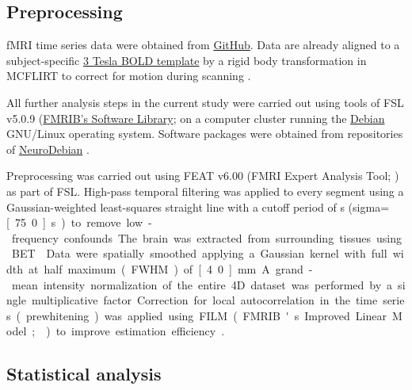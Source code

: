 \documentclass[english]{article}
\begin{document}
\subsection{Preprocessing}




fMRI time series data were obtained from
\href{https://github.com/psychoinformatics-de/studyforrest-data-aligned}{GitHub}.
Data are already aligned to a subject-specific
\href{https://github.com/psychoinformatics-de/studyforrest-data-templatetransforms}{3
Tesla BOLD template} by a rigid body transformation in MCFLIRT
\citep{jenkinson2002registration} to correct for motion during scanning
\citep{sengupta2016extension}.

All further analysis steps in the current study were carried out using tools of
FSL v5.0.9 (\href{https://www.fmrib.ox.ac.uk/fsl}{FMRIB's Software
Library}; \citep{smith2004fsl} on a computer cluster running the
\href{https://www.debian.org}{Debian} GNU/Linux operating system. Software
packages were obtained from repositories of
\href{http://neuro.debian.net}{NeuroDebian} \citep{halchenko2012open}.

Preprocessing was carried out using FEAT v6.00 (FMRI Expert Analysis Tool;
\citep{woolrich2001autocorr}) as part of FSL.
High-pass temporal filtering was applied to every segment using a
Gaussian-weighted least-squares straight line with a cutoff period of
\unit[150]{s} (sigma=\unit[75.0]{s}) to remove low-frequency confounds.
The brain was extracted from surrounding tissues using BET \citep{smith2002bet}.
Data were spatially smoothed applying a Gaussian kernel with full width at half
maximum (FWHM) of \unit[4.0]{mm}.
A grand-mean intensity normalization of the entire 4D dataset was performed by a
single multiplicative factor.
Correction for local autocorrelation in the time series (prewhitening) was
applied using FILM (FMRIB's Improved Linear Model; \citep{woolrich2001autocorr})
to improve estimation efficiency \citep{woolrich2001autocorr}.

\subsection{Statistical analysis}
\end{document}
